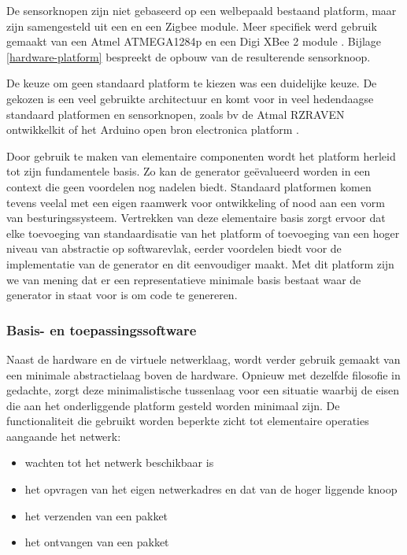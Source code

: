 De sensorknopen zijn niet gebaseerd op een welbepaald bestaand platform, maar
zijn samengesteld uit een \mcu en een Zigbee module. Meer specifiek werd
gebruik gemaakt van een Atmel ATMEGA1284p \citep{datasheet:atmega1284p} en een
Digi XBee 2 module \citep{manual:xbee}. Bijlage \ref{hardware-platform}
bespreekt de opbouw van de resulterende sensorknoop.

De keuze om geen standaard platform te kiezen was een duidelijke keuze. De
gekozen \mcu is een veel gebruikte architectuur en komt voor in veel
hedendaagse standaard platformen en sensorknopen, zoals bv de Atmal RZRAVEN
ontwikkelkit \citep{manual:rzraven} of het Arduino open bron electronica
platform \citep{url:arduino}.

Door gebruik te maken van elementaire componenten wordt het platform herleid
tot zijn fundamentele basis. Zo kan de generator ge\"evalueerd worden in een
context die geen voordelen nog nadelen biedt. Standaard platformen komen tevens
veelal met een eigen raamwerk voor ontwikkeling of nood aan een vorm van
besturingssysteem. Vertrekken van deze elementaire basis zorgt ervoor dat elke
toevoeging van standaardisatie van het platform of toevoeging van een hoger
niveau van abstractie op softwarevlak, eerder voordelen biedt voor de
implementatie van de generator en dit eenvoudiger maakt. Met dit platform zijn
we van mening dat er een representatieve minimale basis bestaat waar de
generator in staat voor is om code te genereren.

\subsubsection{Basis- en toepassingssoftware}

Naast de hardware en de virtuele netwerklaag, wordt verder gebruik gemaakt van
een minimale abstractielaag boven de hardware. Opnieuw met dezelfde filosofie
in gedachte, zorgt deze minimalistische tussenlaag voor een situatie waarbij de
eisen die aan het onderliggende platform gesteld worden minimaal zijn. De
functionaliteit die gebruikt worden beperkte zicht tot elementaire operaties
aangaande het netwerk:

\begin{itemize}

  \item wachten tot het netwerk beschikbaar is

  \item het opvragen van het eigen netwerkadres en dat van de hoger liggende
  knoop

  \item het verzenden van een pakket
  
  \item het ontvangen van een pakket

\end{itemize}

